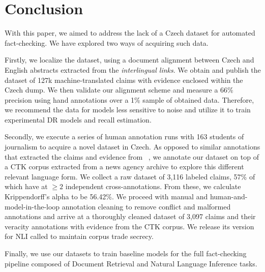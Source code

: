 \section{Conclusion}\label{sec:conclusion}

With this paper, we aimed to address the lack of a Czech dataset for automated fact-checking.
We have explored two ways of acquiring such data.

Firstly, we localize the \FEN dataset, using a document alignment between Czech and English \Wikipedia abstracts extracted from the \textit{interlingual links}.
We obtain and publish the \FCZ dataset of 127k machine-translated claims with evidence enclosed within the Czech \Wikipedia dump.
We then validate our alignment scheme and measure a 66\% precision using hand annotations over a 1\% sample of obtained data.
Therefore, we recommend the data for models less sensitive to noise and utilize it to train experimental DR models and recall estimation.

Secondly, we execute a series of human annotation runs with 163 students of journalism to acquire a novel dataset in Czech.
As opposed to similar annotations that extracted the claims and evidence from \Wikipedia~\cite{fever2018,norregaard2021danfever,aly2021feverous}, we annotate our dataset on top of a CTK corpus extracted from a news agency archive to explore this different relevant language form. 
We collect a raw dataset of 3,116 labeled claims, 57\% of which have at $\geq2$ independent cross-annotations.
From these, we calculate Krippendorff's alpha to be 56.42\%.
We proceed with manual and human-and-model-in-the-loop annotation cleaning to remove conflict and malformed annotations and arrive at a thoroughly cleaned \CTK dataset of 3,097 claims and their veracity annotations with evidence from the CTK corpus.
We release its version for NLI called \CTKNLI to maintain corpus trade secrecy.

Finally, we use our datasets to train baseline models for the full fact-checking pipeline composed of Document Retrieval and Natural Language Inference tasks.

